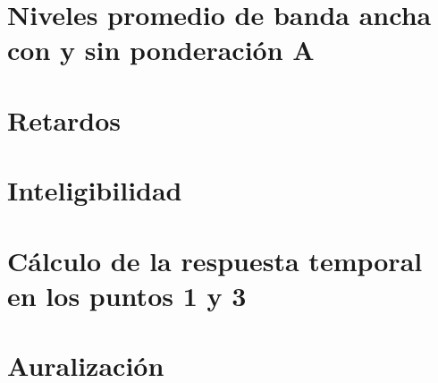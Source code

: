 \documentclass{article}
\begin{document}
\section{Niveles promedio de banda ancha con y sin ponderación A}
\section{Retardos}
\section{Inteligibilidad}
\section{Cálculo de la respuesta temporal en los puntos 1 y 3}
\section{Auralización}

%
%
\end{document}
